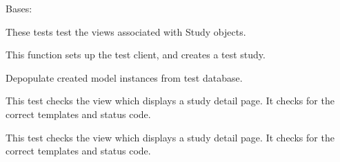 \documentclass[letterpaper,10pt,english]{sphinxmanual}
\begin{document}
\begin{fulllineitems}
\label{api:mousedb.data.tests.StudyViewTests}
Bases: 

These tests test the views associated with Study objects.


\begin{fulllineitems}
\label{api:mousedb.data.tests.StudyViewTests.setUp}
This function sets up the test client, and creates a test study.

\end{fulllineitems}



\begin{fulllineitems}
\label{api:mousedb.data.tests.StudyViewTests.tearDown}
Depopulate created model instances from test database.

\end{fulllineitems}



\begin{fulllineitems}
\label{api:mousedb.data.tests.StudyViewTests.test_study_delete}
This test checks the view which displays a study detail page.  It checks for the correct templates and status code.

\end{fulllineitems}



\begin{fulllineitems}
\label{api:mousedb.data.tests.StudyViewTests.test_study_detail}
This test checks the view which displays a study detail page.  It checks for the correct templates and status code.

\end{fulllineitems}




\end{fulllineitems}
\end{document}
